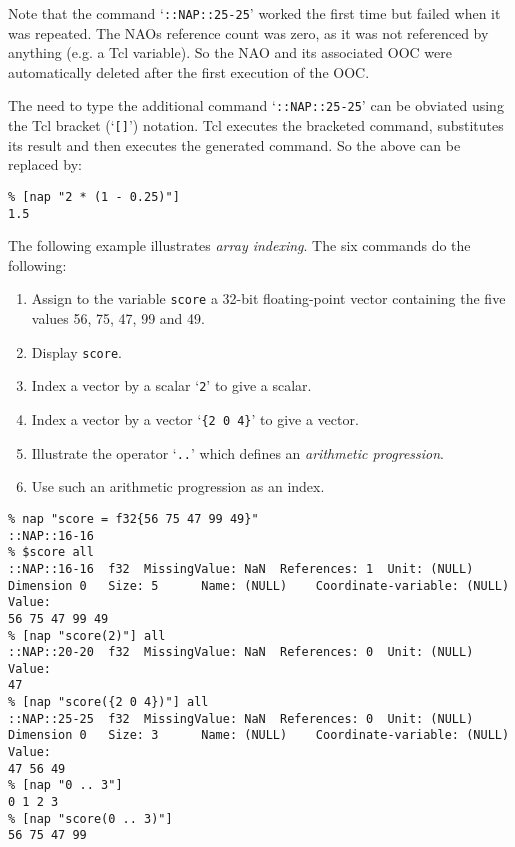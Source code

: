     

Note that the command `\texttt{::NAP::25-25}' worked the first time but failed
    when it was repeated. The NAOs reference count was zero, as it was
    not referenced by anything (e.g. a Tcl variable). So the NAO and
    its associated OOC were automatically deleted after the first
    execution of the OOC.
    

The need to type the additional command `\texttt{::NAP::25-25}' can be obviated using the Tcl
    bracket (`\texttt{[]}') notation. Tcl executes the bracketed
    command, substitutes its result and then executes the generated
    command. So the above can be replaced by:
    \begin{verbatim}
% [nap "2 * (1 - 0.25)"]
1.5
\end{verbatim}

    

The following example illustrates 
    \emph{array indexing}. The six commands do the following:
    \begin{enumerate}
      \item Assign to the variable 
      \texttt{score} a 32-bit floating-point vector containing the
      five values 56, 75, 47, 99 and 49.
      \item Display 
      \texttt{score}.
      \item Index a vector by a scalar `\texttt{2}' to give a scalar.
      \item Index a vector by a vector `\texttt{\{2 0 4\}}' to give a vector.
      \item Illustrate the operator `\texttt{..}' which defines an 
      \emph{arithmetic progression}.
      \item Use such an arithmetic progression as an index.
    \end{enumerate}
    \begin{verbatim}
% nap "score = f32{56 75 47 99 49}"
::NAP::16-16
% $score all
::NAP::16-16  f32  MissingValue: NaN  References: 1  Unit: (NULL)
Dimension 0   Size: 5      Name: (NULL)    Coordinate-variable: (NULL)
Value:
56 75 47 99 49
% [nap "score(2)"] all
::NAP::20-20  f32  MissingValue: NaN  References: 0  Unit: (NULL)
Value:
47
% [nap "score({2 0 4})"] all
::NAP::25-25  f32  MissingValue: NaN  References: 0  Unit: (NULL)
Dimension 0   Size: 3      Name: (NULL)    Coordinate-variable: (NULL)
Value:
47 56 49
% [nap "0 .. 3"]
0 1 2 3
% [nap "score(0 .. 3)"]
56 75 47 99
\end{verbatim}

    

